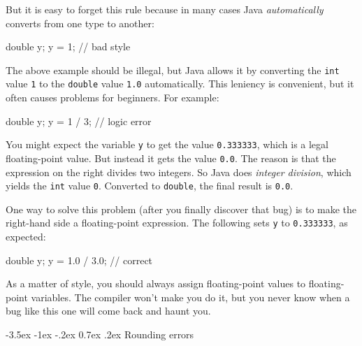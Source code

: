 \documentclass[12pt]{book}
\makeatletter
\theoremstyle{exercise}
\newcommand{\java}[1]{\verb"#1"}
\renewcommand{\section}{\@startsection{section}{1}{\z@}%
    {-3.5ex \@plus -1ex \@minus -.2ex}%
    {0.7ex \@plus.2ex}%
    {\normalfont\Large\bfseries}}
\newcommand{\java}[1]{\lstinline{#1}} %
\makeatother
\begin{document}
But it is easy to forget this rule because in many cases Java {\em automatically} converts from one type to another:

\begin{code}
    double y;
    y = 1;  // bad style
\end{code}

The above example should be illegal, but Java allows it by converting the \java{int} value \java{1} to the \java{double} value \java{1.0} automatically.
This leniency is convenient, but it often causes problems for beginners.
For example:

\begin{code}
    double y;
    y = 1 / 3;  // logic error
\end{code}


You might expect the variable \java{y} to get the value \java{0.333333}, which is a legal floating-point value.
But instead it gets the value \java{0.0}.
The reason is that the expression on the right divides two integers.
So Java does {\em integer division}, which yields the \java{int} value \java{0}.
Converted to \java{double}, the final result is \java{0.0}.

One way to solve this problem (after you finally discover that bug) is to make the right-hand side a floating-point expression.
The following sets \java{y} to \java{0.333333}, as expected:

\begin{code}
    double y;
    y = 1.0 / 3.0;  // correct
\end{code}

As a matter of style, you should always assign floating-point values to floating-point variables.
The compiler won't make you do it, but you never know when a bug like this one will come back and haunt you.


\section{Rounding errors}


\end{document}
